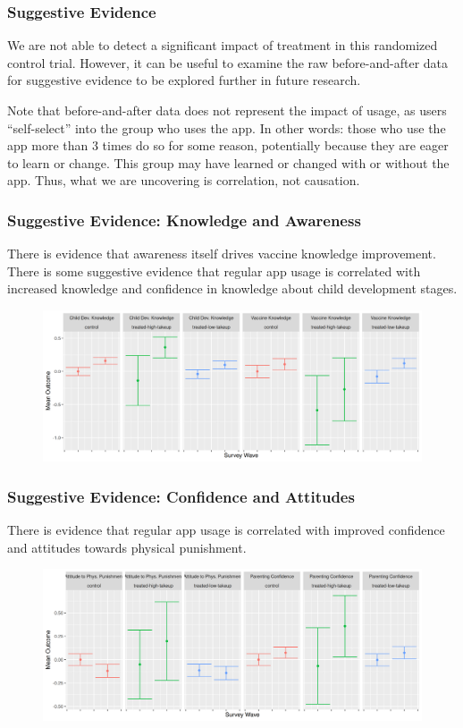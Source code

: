 \documentclass[aspectratio=169]{beamer}
\begin{document}
\begin{frame}
  \frametitle{Suggestive Evidence}

We are not able to detect a significant impact of treatment in this randomized control trial. However, it can be useful to examine the raw before-and-after data for suggestive evidence to be explored further in future research. 

Note that before-and-after data does not represent the impact of usage, as users ``self-select'' into the group who uses the app. In other words: those who use the app more than 3 times do so for some reason, potentially because they are eager to learn or change. This group may have learned or changed with or without the app. Thus, what we are uncovering is correlation, not causation. 

\end{frame}

\begin{frame}
 \frametitle{Suggestive Evidence: Knowledge and Awareness}
There is evidence that awareness itself drives vaccine knowledge improvement. There is some suggestive evidence that regular app usage is correlated with increased knowledge and confidence in knowledge about child development stages. 
\begin{figure}[H]
  \centering
\includegraphics[width=\textwidth]{../plots/pre_post/Pooled: Vaccine Knowledge.png}
\label{fig:knowledge-pre-post}
\end{figure}
   
\end{frame}

\begin{frame}
 \frametitle{Suggestive Evidence: Confidence and Attitudes}

There is evidence that regular app usage is correlated with improved confidence and attitudes towards physical punishment. 
\begin{figure}[H]
  \centering
\includegraphics[width=\textwidth]{../plots/pre_post/Pooled: Parenting Confidence.png}
\label{fig:confidence-and-attitudes-pre-post}
\end{figure}
   
\end{frame}
\end{document}
